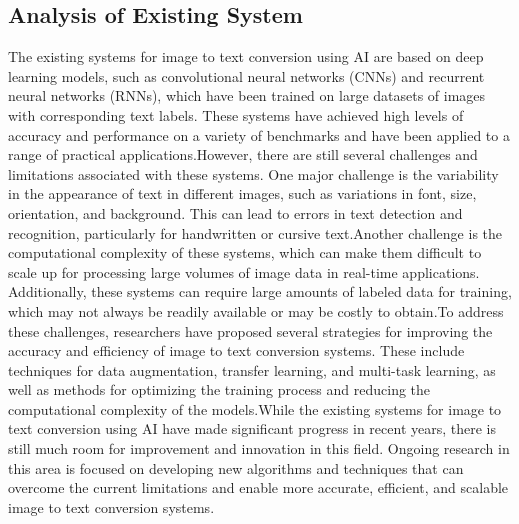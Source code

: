 \subsection{Analysis of Existing System}
\begin{enumerate}

    The existing systems for image to text conversion using AI are based on deep learning models, such as convolutional neural networks (CNNs) and recurrent neural networks (RNNs), which have been trained on large datasets of images with corresponding text labels. These systems have achieved high levels of accuracy and performance on a variety of benchmarks and have been applied to a range of practical applications.However, there are still several challenges and limitations associated with these systems. One major challenge is the variability in the appearance of text in different images, such as variations in font, size, orientation, and background. This can lead to errors in text detection and recognition, particularly for handwritten or cursive text.Another challenge is the computational complexity of these systems, which can make them difficult to scale up for processing large volumes of image data in real-time applications. Additionally, these systems can require large amounts of labeled data for training, which may not always be readily available or may be costly to obtain.To address these challenges, researchers have proposed several strategies for improving the accuracy and efficiency of image to text conversion systems. These include techniques for data augmentation, transfer learning, and multi-task learning, as well as methods for optimizing the training process and reducing the computational complexity of the models.While the existing systems for image to text conversion using AI have made significant progress in recent years, there is still much room for improvement and innovation in this field. Ongoing research in this area is focused on developing new algorithms and techniques that can overcome the current limitations and enable more accurate, efficient, and scalable image to text conversion systems.
\end{enumerate}

